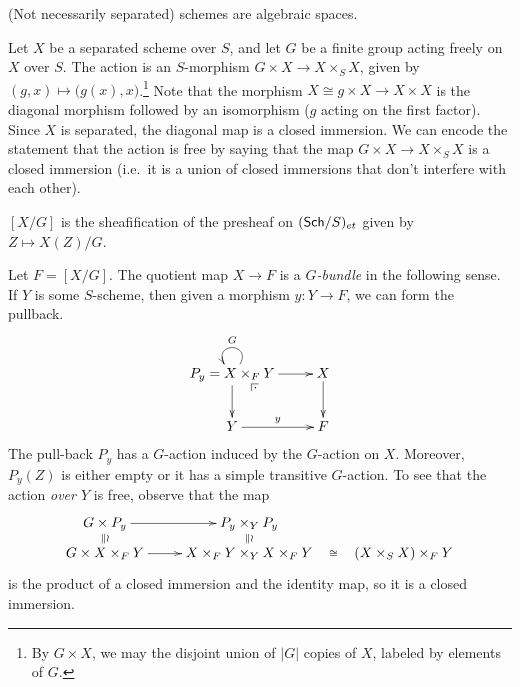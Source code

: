 \begin{example}
 (Not necessarily separated) schemes are algebraic spaces.
\end{example}


 Let $X$ be a separated scheme over $S$, and let $G$ be a finite group acting freely on
 $X$ over $S$. The action is an $S$-morphism $G\times X\to X\times_S X$, given by
 $(g,x)\mapsto \bigl(g(x),x\bigr)$.\footnote{By $G\times X$, we may the disjoint union of
 $|G|$ copies of $X$, labeled by elements of $G$.} Note that the morphism $X\cong g\times
 X\to X\times X$ is the diagonal morphism followed by an isomorphism ($g$ acting on the
 first factor). Since $X$ is separated, the diagonal map is a closed immersion. We can
 encode the statement that the action is free by saying that the map $G\times X\to
 X\times_S X$ is a closed immersion (i.e.~it is a union of closed immersions that don't
 interfere with each other).
 \begin{definition}
   $[X/G]$ is the sheafification of the presheaf on $(\text{\sf Sch}/S)_{et}$ given by $Z\mapsto
   X(Z)/G$.
 \end{definition}
 Let $F=[X/G]$. The quotient map $X\to F$ is a \emph{$G$-bundle} in the following sense.
 If $Y$ is some $S$-scheme, then given a morphism $y:Y\to F$, we can form the
 pullback.
 \[\xymatrix{
  P_y=X\times_F Y  \ar[d] \ar[r] \ar@(ur,ul)_G \ar@{}[dr]|(.25)\pb
  & X \ar[d]\\
  Y\ar[r]^y & F }\] The pull-back $P_y$ has a $G$-action induced by the $G$-action on
 $X$. Moreover, $P_y(Z)$ is either empty or it has a simple transitive $G$-action.
  To see that the action \emph{over $Y$} is free,
 observe that the map
 \[\xymatrix@R-1.5pc{
    G\times P_y \ar[r] \ar@{}[d]|{\parallel\wr} & P_y\times_Y P_y \ar@{}[d]|{\parallel\wr} \\
    G\times X\times_F Y\ar[r] & X\times_F Y\times_Y X\times_F Y \ar@{}[r]|<>(.5){\cong} &
    (X\times_S X)\times_F Y
 }\]
  is the product of a closed immersion and the identity map, so it is a closed immersion.

